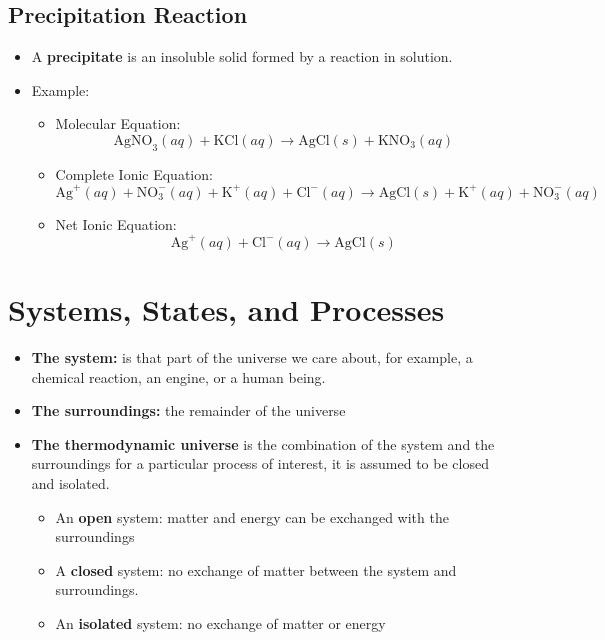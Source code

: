 \documentclass[10pt]{article}
\begin{document}
\subsection*{Precipitation Reaction}
\begin{itemize}
    \item A \textbf{precipitate} is an insoluble solid formed by a reaction in solution.
    \item Example:
    \begin{itemize}
        \item Molecular Equation:
        \[\text{AgNO}_3(aq) + \text{KCl}(aq) \longrightarrow \text{AgCl}(s) + \text{KNO}_3(aq)\]
        \item Complete Ionic Equation:
        \[\text{Ag}^+(aq) + \text{NO}_3^-(aq) + \text{K}^+(aq) + \text{Cl}^-(aq) \longrightarrow \text{AgCl}(s) + \text{K}^+(aq) + \text{NO}_3^-(aq)\]
        \item Net Ionic Equation:
        \[\text{Ag}^+(aq) + \text{Cl}^-(aq) \longrightarrow \text{AgCl}(s)\]
    \end{itemize}
\end{itemize}

\section*{Systems, States, and Processes}
\begin{itemize}
    \item \textbf{The system:} is that part of the universe we care about, for example, a chemical reaction, an engine, or a human being.
    \item \textbf{The surroundings:} the remainder of the universe
    \item \textbf{The thermodynamic universe} is the combination of the system and the surroundings for a particular process of interest, it is assumed to be closed and isolated.
    \begin{itemize}
        \item An \textbf{open} system: matter and energy can be exchanged with the surroundings
        \item A \textbf{closed} system: no exchange of matter between the system and surroundings.
        \item An \textbf{isolated} system: no exchange of matter or energy
    \end{itemize}
\end{itemize}
\end{document}
